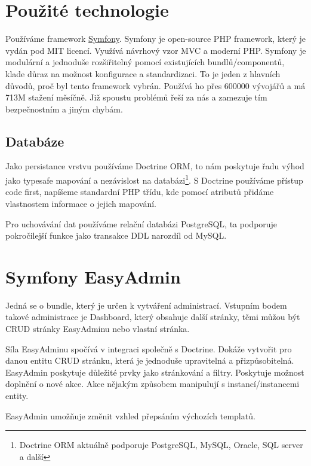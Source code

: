 
\section{Použité technologie}

Používáme framework \href{https://symfony.com/}{Symfony}.
Symfony je open-source PHP framework, který je vydán pod MIT licencí.
Využívá návrhový vzor MVC a moderní PHP.
Symfony je modulární a jednoduše rozšiřitelný pomocí existujících bundlů/componentů, klade důraz na možnost konfigurace a standardizaci.
To je jeden z hlavních důvodů, proč byl tento framework vybrán.
Používá ho přes 600000 vývojářů a má 713M stažení měsíčně.\cite{symfony:what-is}
Již spoustu problémů řeší za nás a zamezuje tím bezpečnostním a jiným chybám.


\subsection{Databáze}
Jako persistance vrstvu používáme Doctrine ORM, to nám poskytuje řadu výhod jako typesafe mapování a nezávislost na databázi\footnote{Doctrine ORM aktuálně podporuje PostgreSQL, MySQL, Oracle, SQL server a další\cite{doctrine-supported-dbs}}.
S Doctrine používáme přístup code first, napíšeme standardní PHP třídu, kde pomocí atributů přidáme vlastnostem informace o jejich mapování. 

Pro uchovávání dat používáme relační databázi PostgreSQL, ta podporuje pokročilejší funkce jako transakce DDL narozdíl od MySQL.  


\section{Symfony EasyAdmin}

Jedná se o bundle, který je určen k vytváření administrací.
Vstupním bodem takové administrace je Dashboard, který obsahuje další stránky, těmi můžou být CRUD stránky EasyAdminu nebo vlastní stránka.

Síla EasyAdminu spočívá v integraci společně s Doctrine.
Dokáže vytvořit pro danou entitu CRUD stránku, která je jednoduše upravitelná a přizpůsobitelná.
EasyAdmin poskytuje důležité prvky jako stránkování a filtry.
Poskytuje možnost doplnění o nové akce. Akce nějakým způsobem manipulují s instancí/instancemi entity.

EasyAdmin umožňuje změnit vzhled přepsáním výchozích templatů.


